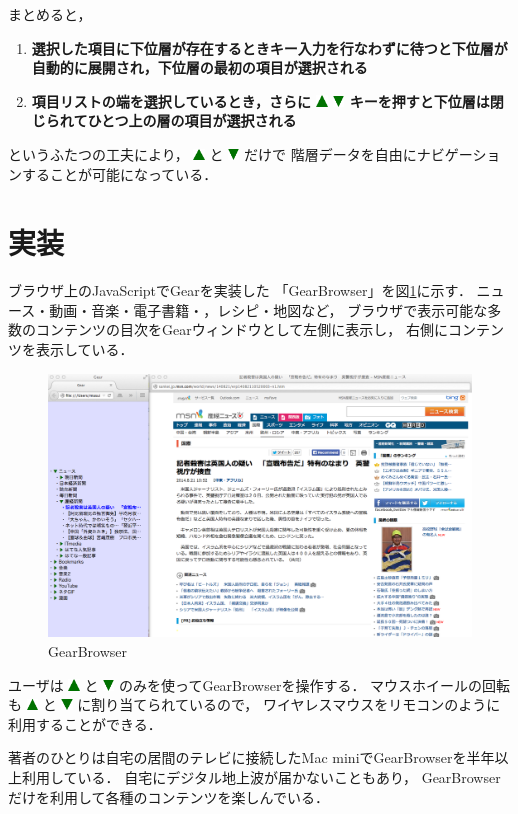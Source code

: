 \documentclass[twoside]{wiss}
\def\GEAR{\textsf{Gear}}
\def\GB{\textsf{GearBrowser}}
\def\up{ \includegraphics[width=3mm,bb=0 0 36 36]{figures/uptriangle.pdf} }
\def\down{ \includegraphics[width=3mm,bb=0 0 36 36]{figures/downtriangle.pdf} }
\begin{document}
まとめると，

\begin{enumerate}
\item \textbf{選択した項目に下位層が存在するときキー入力を行なわずに待つと下位層が自動的に展開され，下位層の最初の項目が選択される}
\item \textbf{項目リストの端を選択しているとき，さらに{\up}{\down}キーを押すと下位層は閉じられてひとつ上の層の項目が選択される}
\end{enumerate}

\noindent
というふたつの工夫により，
{\up}と{\down}だけで
階層データを自由にナビゲーションすることが可能になっている．

\section{実装}

ブラウザ上のJavaScriptで{\GEAR}を実装した
「{\GB}」を図\ref{gearbrowser}に示す．
ニュース・動画・音楽・電子書籍・，レシピ・地図など，
ブラウザで表示可能な多数のコンテンツの目次を{\GEAR}ウィンドウとして左側に表示し，
右側にコンテンツを表示している．

\begin{figure}
\centerline{\includegraphics[width=180mm,bb=0 0 1401 872]{figures/ab4ff7c2d44f4af2bb94fae76589f495.png}}
\caption{\textsf{GearBrowser}}
\label{gearbrowser}
\end{figure}

ユーザは{\up}と{\down}のみを使って{\GB}を操作する．
マウスホイールの回転も{\up}と{\down}に割り当てられているので，
ワイヤレスマウスをリモコンのように利用することができる．

著者のひとりは自宅の居間のテレビに接続したMac miniで{\GB}を半年以上利用している．
自宅にデジタル地上波が届かないこともあり，
{\GB}だけを利用して各種のコンテンツを楽しんでいる．
\end{document}
